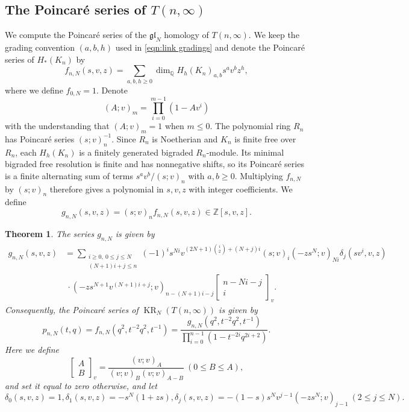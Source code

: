 \documentclass[reqno]{amsart}
\newtheorem{thm}{Theorem}[section]
\theoremstyle{definition}
\theoremstyle{remark}
\newcommand{\Z}{\mathbb Z}
\newcommand{\QQ}{\mathbb{Q}}
\newcommand{\gl}{\mathfrak{gl}}
\DeclareMathOperator{\dimm}{dim}
\DeclareMathOperator{\KR}{KR}
\begin{document}
\subsection{\texorpdfstring{The Poincar\'e series of $T(n,\infty)$}{The Poincaré series of T(n,infinity)}}We compute the Poincar\'e series of the $\gl_N$ homology of $T(n,\infty)$. We keep the grading convention $(a,b,h)$ used in \eqref{eqn:link gradings} and denote the Poincar\'e series of $H_*(K_n)$ by
\[f_{n,N}(s,v,z)=\sum_{a,b,h\ge0}\dimm_{\QQ}H_h(K_n)_{a,b}s^av^bz^h,\]where we define $f_{0,N}=1$. Denote \[(A;v)_m=\prod_{i=0}^{m-1}(1-Av^i)\]with the understanding that $(A;v)_m=1$ when $m\le 0$. The polynomial ring $R_n$ has Poincar\'e series $(s;v)_n^{-1}$. Since $R_n$ is Noetherian and $K_n$ is finite free over $R_n$, each $H_h(K_n)$ is a finitely generated bigraded $R_n$-module. Its minimal bigraded free resolution is finite and has nonnegative shifts, so its Poincar\'e series is a finite alternating sum of terms $s^av^b/(s;v)_n$ with $a,b\ge0$. Multiplying $f_{n,N}$ by $(s;v)_n$ therefore gives a polynomial in $s,v,z$ with integer coefficients. We define \[g_{n,N}(s,v,z)=(s;v)_nf_{n,N}(s,v,z)\in\Z[s,v,z].\]%


\begin{thm}\label{thm:finite Hilbert series}The series $g_{n,N}$ is given by
\begin{equation}\label{eqn:finite Hilbert formula}
\begin{aligned}
g_{n,N}(s,v,z)&=\sum_{\substack{i\ge0,\ 0\le j\le N\\(N+1)i+j\le n}}(-1)^is^{Ni}v^{(2N+1)\binom{i}{2}+(N+j)i}(s;v)_i(-zs^N;v)_{Ni}\delta_j(sv^i,v,z)\\
&\ \cdot(-zs^{N+1}v^{(N+1)i+j};v)_{n-(N+1)i-j}\begin{bmatrix}n-Ni-j\\i\end{bmatrix}_v.
\end{aligned}
\end{equation}
Consequently, the Poincar\'e series of $\KR_N(T(n,\infty))$ is given by
\[
p_{n,N}(t,q)=f_{n,N}(q^2,t^{-2}q^2,t^{-1})=\frac{g_{n,N}(q^2,t^{-2}q^2,t^{-1})}{\prod_{i=0}^{n-1}(1-t^{-2i}q^{2i+2})}.
\]Here we define
\[\begin{bmatrix}A\\B\end{bmatrix}_v=\frac{(v;v)_A}{(v;v)_B(v;v)_{A-B}}\ (0\le B\le A),\]
and set it equal to zero otherwise, and let
\[
\delta_0(s,v,z)=1,\delta_1(s,v,z)=-s^N(1+zs),\delta_j(s,v,z)=-(1-s)s^Nv^{j-1}(-zs^N;v)_{j-1}\ (2\le j\le N).
\]

\end{thm}
\end{document}
